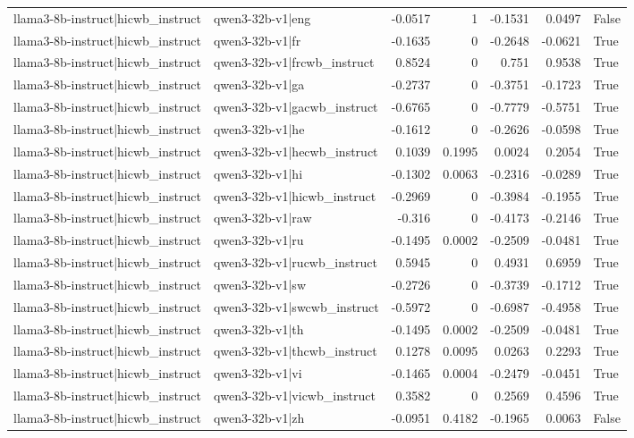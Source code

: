 \begin{table}
\begin{tabular}{l l r r r r l}
llama3-8b-instruct|hicwb_instruct & qwen3-32b-v1|eng & -0.0517 & 1 & -0.1531 & 0.0497 & False \\
llama3-8b-instruct|hicwb_instruct & qwen3-32b-v1|fr & -0.1635 & 0 & -0.2648 & -0.0621 & True \\
llama3-8b-instruct|hicwb_instruct & qwen3-32b-v1|frcwb_instruct & 0.8524 & 0 & 0.751 & 0.9538 & True \\
llama3-8b-instruct|hicwb_instruct & qwen3-32b-v1|ga & -0.2737 & 0 & -0.3751 & -0.1723 & True \\
llama3-8b-instruct|hicwb_instruct & qwen3-32b-v1|gacwb_instruct & -0.6765 & 0 & -0.7779 & -0.5751 & True \\
llama3-8b-instruct|hicwb_instruct & qwen3-32b-v1|he & -0.1612 & 0 & -0.2626 & -0.0598 & True \\
llama3-8b-instruct|hicwb_instruct & qwen3-32b-v1|hecwb_instruct & 0.1039 & 0.1995 & 0.0024 & 0.2054 & True \\
llama3-8b-instruct|hicwb_instruct & qwen3-32b-v1|hi & -0.1302 & 0.0063 & -0.2316 & -0.0289 & True \\
llama3-8b-instruct|hicwb_instruct & qwen3-32b-v1|hicwb_instruct & -0.2969 & 0 & -0.3984 & -0.1955 & True \\
llama3-8b-instruct|hicwb_instruct & qwen3-32b-v1|raw & -0.316 & 0 & -0.4173 & -0.2146 & True \\
llama3-8b-instruct|hicwb_instruct & qwen3-32b-v1|ru & -0.1495 & 0.0002 & -0.2509 & -0.0481 & True \\
llama3-8b-instruct|hicwb_instruct & qwen3-32b-v1|rucwb_instruct & 0.5945 & 0 & 0.4931 & 0.6959 & True \\
llama3-8b-instruct|hicwb_instruct & qwen3-32b-v1|sw & -0.2726 & 0 & -0.3739 & -0.1712 & True \\
llama3-8b-instruct|hicwb_instruct & qwen3-32b-v1|swcwb_instruct & -0.5972 & 0 & -0.6987 & -0.4958 & True \\
llama3-8b-instruct|hicwb_instruct & qwen3-32b-v1|th & -0.1495 & 0.0002 & -0.2509 & -0.0481 & True \\
llama3-8b-instruct|hicwb_instruct & qwen3-32b-v1|thcwb_instruct & 0.1278 & 0.0095 & 0.0263 & 0.2293 & True \\
llama3-8b-instruct|hicwb_instruct & qwen3-32b-v1|vi & -0.1465 & 0.0004 & -0.2479 & -0.0451 & True \\
llama3-8b-instruct|hicwb_instruct & qwen3-32b-v1|vicwb_instruct & 0.3582 & 0 & 0.2569 & 0.4596 & True \\
llama3-8b-instruct|hicwb_instruct & qwen3-32b-v1|zh & -0.0951 & 0.4182 & -0.1965 & 0.0063 & False \\

\end{tabular}
\end{table}
